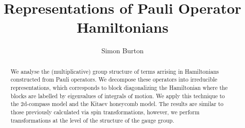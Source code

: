 \documentclass[12pt,notitlepage,longbibliography,nofootinbib,tightenlines]{revtex4}
\begin{document}
\title{Representations of Pauli Operator Hamiltonians}

\author{Simon Burton}


\begin{abstract}
We analyse the (multiplicative) group structure of terms arrising
in Hamiltonians constructed from Pauli operators.
We decompose these operators into irreducible 
representations, which corresponds to block diagonalizing
the Hamiltonian where the blocks are labelled by
eigenvalues of integrals of motion.
We apply this technique to the 2d-compass model
and the Kitaev honeycomb model.
The results are similar to those previously 
calculated via spin transformations,
however, we perform transformations at
the level of the structure of the gauge group.
\end{abstract}

\maketitle


\def\Complex{\mathbb{C}}
\def\Z{\mathbb{Z}}
\def\Ham{\mathcal{H}}
\def\Pauli{\mathcal{P}}
\def\Spec{\mbox{Spec}}
\def\Proveit{{\it (Proof??)}}
\def\GL{\mathrm{GL}}
\def\half{\frac{1}{2}}

%
%


\end{document}
